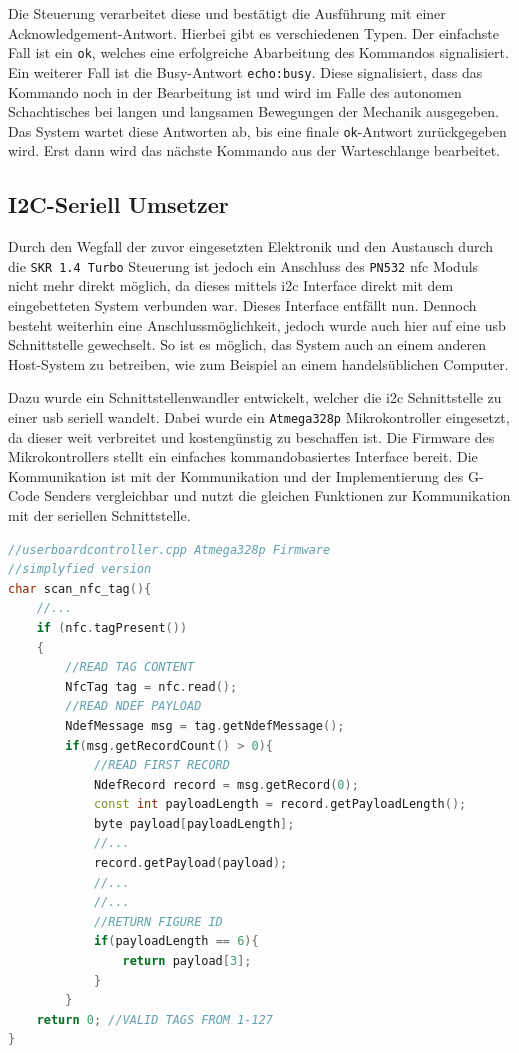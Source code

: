 Die Steuerung verarbeitet diese und bestätigt die Ausführung mit einer
Acknowledgement-Antwort. Hierbei gibt es verschiedenen Typen. Der
einfachste Fall ist ein \passthrough{\lstinline!ok!}, welches eine
erfolgreiche Abarbeitung des Kommandos signalisiert. Ein weiterer Fall
ist die Busy-Antwort \passthrough{\lstinline!echo:busy!}. Diese
signalisiert, dass das Kommando noch in der Bearbeitung ist und wird im
Falle des autonomen Schachtisches bei langen und langsamen Bewegungen
der Mechanik ausgegeben. Das System wartet diese Antworten ab, bis eine
finale \passthrough{\lstinline!ok!}-Antwort zurückgegeben wird. Erst
dann wird das nächste Kommando aus der Warteschlange bearbeitet.

\hypertarget{i2c-seriell-umsetzer}{%
\subsection{I2C-Seriell Umsetzer}\label{i2c-seriell-umsetzer}}

Durch den Wegfall der zuvor eingesetzten Elektronik und den Austausch
durch die \passthrough{\lstinline!SKR 1.4 Turbo!} Steuerung ist jedoch
ein Anschluss des \passthrough{\lstinline!PN532!} \gls{nfc} Moduls nicht
mehr direkt möglich, da dieses mittels \gls{i2c} Interface direkt mit
dem eingebetteten System verbunden war. Dieses Interface entfällt nun.
Dennoch besteht weiterhin eine Anschlussmöglichkeit, jedoch wurde auch
hier auf eine \gls{usb} Schnittstelle gewechselt. So ist es möglich, das
System auch an einem anderen Host-System zu betreiben, wie zum Beispiel
an einem handelsüblichen Computer.

Dazu wurde ein Schnittstellenwandler entwickelt, welcher die \gls{i2c}
Schnittstelle zu einer \gls{usb} seriell wandelt. Dabei wurde ein
\passthrough{\lstinline!Atmega328p!} Mikrokontroller eingesetzt, da
dieser weit verbreitet und kostengünstig zu beschaffen ist. Die Firmware
des Mikrokontrollers stellt ein einfaches kommandobasiertes Interface
bereit. Die Kommunikation ist mit der Kommunikation und der
Implementierung des G-Code Senders vergleichbar und nutzt die gleichen
Funktionen zur Kommunikation mit der seriellen Schnittstelle.

\begin{lstlisting}[language={C++}]
//userboardcontroller.cpp Atmega328p Firmware
//simplyfied version
char scan_nfc_tag(){
    //...
    if (nfc.tagPresent())
    {
        //READ TAG CONTENT
        NfcTag tag = nfc.read();
        //READ NDEF PAYLOAD
        NdefMessage msg = tag.getNdefMessage();
        if(msg.getRecordCount() > 0){
            //READ FIRST RECORD
            NdefRecord record = msg.getRecord(0);
            const int payloadLength = record.getPayloadLength();
            byte payload[payloadLength];
            //...
            record.getPayload(payload);
            //...
            //...
            //RETURN FIGURE ID
            if(payloadLength == 6){
                return payload[3];
            }
        }
    return 0; //VALID TAGS FROM 1-127
}
\end{lstlisting}

